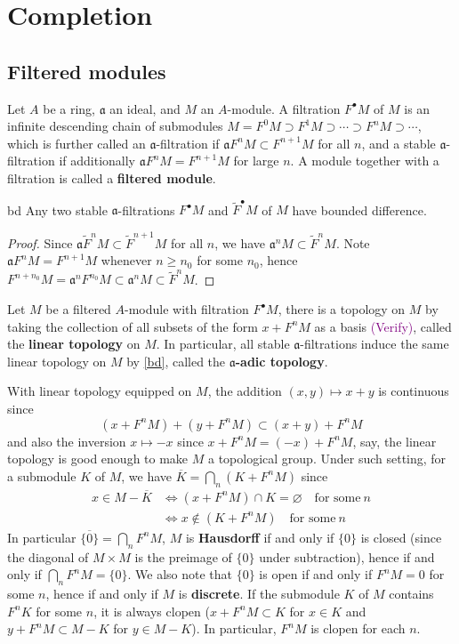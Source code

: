 \documentclass[10pt]{extarticle}
\begin{document}
\newpage

\section{Completion}

\subsection{Filtered modules}
Let $A$ be a ring, $\mathfrak{a}$ an ideal, and $M$ an $A$-module. A filtration $F^\bullet M$ of $M$ is an infinite descending chain of submodules $M=F^0M\supset F^1M\supset\cdots\supset F^nM\supset\cdots$, which is further called an $\mathfrak
{a}$-filtration if $\mathfrak{a}F^nM\subset F^{n+1}M$ for all $n$, and a stable $\mathfrak{a}$-filtration if additionally $\mathfrak{a}F^nM=F^{n+1}M$ for large $n$. A module together with a filtration is called a \textbf{filtered module}.

\begin{lemma}{}{bd}
    Any two stable $\mathfrak{a}$-filtrations $F^\bullet M$ and $\widetilde{F}^\bullet M$ of $M$ have bounded difference.
\end{lemma}

\begin{proof}
    Since $\mathfrak{a}\widetilde{F}^nM\subset \widetilde{F}^{n+1}M$ for all $n$, we have $\mathfrak{a}^nM\subset \widetilde{F}^nM$. Note $\mathfrak
    {a}F^nM=F^{n+1}M$ whenever $n\geq n_0$ for some $n_0$, hence $F^{n+n_0}M=\mathfrak{a}^nF^{n_0}M\subset \mathfrak{a}^nM\subset \widetilde{F}^nM$.
\end{proof}

Let $M$ be a filtered $A$-module with filtration $F^\bullet M$, there is a topology on $M$ by taking the collection of all subsets of the form $x+F^nM$ as a basis \textcolor{purple}{(Verify)}, called the \textbf{linear topology} on $M$. In particular, all stable $\mathfrak{a}$-filtrations induce the same linear topology on $M$ by \cref{bd}, called the \textbf{$\mathfrak{a}$-adic topology}. 

With linear topology equipped on $M$, the addition $(x,y)\mapsto x+y$ is continuous since
\[
(x+F^nM)+(y+F^nM)\subset (x+y)+F^nM
\]
and also the inversion $x\mapsto -x$ since $x+F^nM=(-x)+F^nM$, say, the linear topology is good enough to make $M$ a topological group. Under such setting, for a submodule $K$ of $M$, we have $\overline{K}=\bigcap_n(K+F^nM)$ since
\begin{align*}
    x\in M-\overline{K}&\iff (x+F^nM)\cap K=\varnothing\quad\text{for some}\ n\\
    &\iff x\not\in (K+F^nM)\quad\text{for some}\ n
\end{align*}
In particular $\overline{\{0\}}=\bigcap_n F^nM$, $M$ is \textbf{Hausdorff} if and only if $\{0\}$ is closed (since the diagonal of $M\times M$ is the preimage of $\{0\}$ under subtraction), hence if and only if $\bigcap_n F^nM=\{0\}$. We also note that $\{0\}$ is open if and only if $F^nM=0$ for some $n$, hence if and only if $M$ is \textbf{discrete}. If the submodule $K$ of $M$ contains $F^nK$ for some $n$, it is always clopen ($x+F^nM\subset K$ for $x\in K$ and $y+F^nM\subset M-K$ for $y\in M-K$). In particular, $F^nM$ is clopen for each $n$. 
\end{document}
